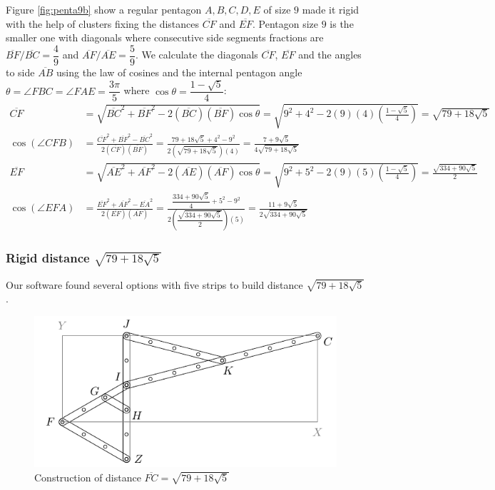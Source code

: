 \documentclass[11pt]{article}
\begin{document}
Figure \ref{fig:penta9b} show a regular pentagon $A,B,C,D,E$ of size $9$ made it rigid with the help of clusters fixing the distances $\overline{CF}$ and $\overline{EF}$. Pentagon size $9$ is the smaller one with diagonals where consecutive side segments fractions are $\overline{BF} / \overline{BC} =\dfrac{4}9$ and $\overline{AF} / \overline{AE} = \dfrac{5}9$. We calculate the diagonals $\overline{CF}$, $\overline{EF}$ and the angles to side $\overline{AB}$ using the law of cosines and the internal pentagon angle $\theta=\angle{FBC}=\angle{FAE}=\dfrac{3\pi}5$ where $\cos\theta = \dfrac{1-\sqrt5}4$:
\begin{align}
\overline{CF} &= \sqrt{
 \overline{BC}^2 + \overline{BF}^2 - 2(\overline{BC})(\overline{BF})\cos\theta } 
 = \sqrt{9^2 + 4^2 - 2(9)(4)\left(\frac{1-\sqrt5}4\right)} = \sqrt{79 + 18\sqrt5}\\
%
\cos(\angle{CFB}) &= 
 \frac{\overline{CF}^2 + \overline{BF}^2 - \overline{BC}^2}{2(\overline{CF})(\overline{BF})}
 = \frac{79 + 18\sqrt5 + 4^2 - 9^2}{2(\sqrt{79 + 18\sqrt5})(4)}
 = \frac{7 + 9\sqrt5}{4\sqrt{79 + 18\sqrt5}} \\
%
\overline{EF} &= \sqrt{
 \overline{AE}^2 + \overline{AF}^2 - 2(\overline{AE})(\overline{AF})\cos\theta} 
 = \sqrt{9^2 + 5^2 - 2(9)(5)\left(\frac{1-\sqrt5}4\right)} = \frac{\sqrt{334 + 90\sqrt5}}2\\
%
\cos(\angle{EFA}) &=
 \frac{\overline{EF}^2 + \overline{AF}^2 - \overline{EA}^2}{2(\overline{EF})(\overline{AF})}
 = \frac{\dfrac{334 + 90\sqrt5}4 + 5^2 - 9^2 }{2\left(\dfrac{\sqrt{334 + 90\sqrt5}}2\right)(5)}
 = \frac{11 + 9\sqrt5}{2\sqrt{334 + 90\sqrt5}}
\end{align}

\subsubsection{Rigid distance $\sqrt{79 + 18\sqrt5}$}

Our software found several options with five strips to build distance $\sqrt{79 + 18\sqrt5}$.

\begin{figure}[H]
\centering
\includegraphics[scale=1]{9/cluster9b1}
\caption{Construction of distance $\overline{FC}=\sqrt{79 + 18\sqrt5}$}
\label{fig:cluster9b1}
\end{figure}
\end{document}
